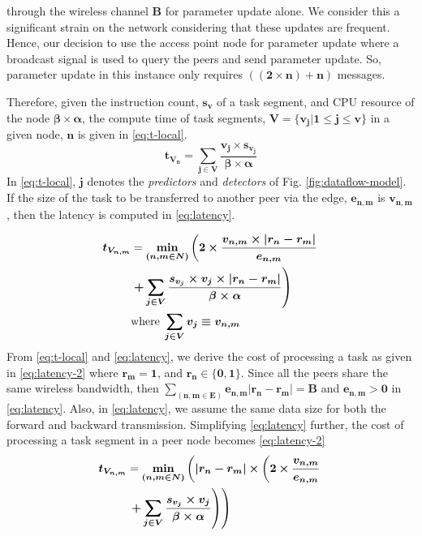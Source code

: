 through the wireless channel $ \bm{B} $ for parameter update 
alone. We consider this a significant strain on the network 
considering that these updates are frequent. Hence, our 
decision to use the access point node for parameter update 
where a broadcast signal is used to query the peers and send 
parameter update. So, parameter update in this 
instance only requires $ {\bm{((2\times n) + n)}} $ messages. 
\par 
Therefore, given the instruction count, $ \bm{s_v} $ of a 
task 
segment, and CPU resource of the node $ \bm{\beta 
\times \alpha} $, the compute time of task segments, ${ 
\bm{V=\{v_j|1\leq j \leq v\}}} $ in a given node, $ \bm{n} $ 
is given in \eqref{eq:t-local}.
\begin{equation}
	\bm{t_{V_n}= \sum_{j\in 
			V} \frac{v_{j}\times 
	s_{v_j}}{\beta\times\alpha}}
	\label{eq:t-local}
\end{equation}
In \eqref{eq:t-local}, $ \bm{j} $ denotes the 
\emph{predictors} and \emph{detectors} of Fig. 
\ref{fig:dataflow-model}. If the size of the task to be 
transferred to another peer via the edge, $ \bm{e_{n,m}} $ is 
$ \bm{v_{n,m}} $, then the latency is computed in 
\eqref{eq:latency}.

\begin{equation}
\begin{split}
\bm{t_{V_{n,m}}} &= \bm{\min_{(n,m\in N)}\left( 2 
\times\frac{v_{n,m}\times|r_n-r_m|}{e_{n,m}}}\right.\\
	& \left. \bm{+\sum_{j\in
			V}\frac{s_{v_j}\times v_j\times|r_n-r_m|}{\beta\times\alpha}\right)}\\
		& \text{where} \; \bm{\sum_{j\in V}v_j \equiv v_{n,m}}
\label{eq:latency}
\end{split}
\end{equation}
From \eqref{eq:t-local} and \eqref{eq:latency}, we derive the 
cost of processing a task as given in \eqref{eq:latency-2} where 
$ \bm{r_m=1} $, and $ \bm{r_n \in \{0,1\}} $. Since all the 
peers share the same wireless bandwidth, then $ 
{\bm{\sum_{(n,m\in E)}e_{n,m}|r_n-r_m|=B}} $ and $ 
{\bm{e_{n,m}>0}} $ in \eqref{eq:latency}. Also, in \eqref{eq:latency}, we assume the same data size for both the forward and backward transmission. Simplifying 
\eqref{eq:latency} further, the cost of processing a task segment in a 
peer node becomes \eqref{eq:latency-2}
\begin{equation}
\begin{split}
\bm{t_{V_{n,m}}} &= \bm{\min_{(n,m\in N)}\left(|r_n-r_m| \times \left( 2 
	\times\frac{v_{n,m}}{e_{n,m}}}\right. \right.\\
&\left. \left. \bm{+\sum_{j\in V}\frac{s_{v_j} \times v_j}{\beta\times\alpha}\right)}\right)
\label{eq:latency-2}
\end{split}
\end{equation}

